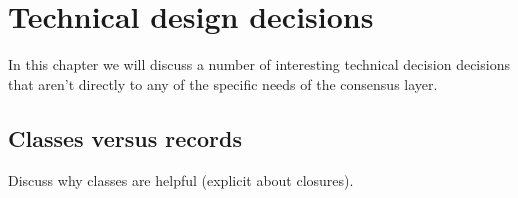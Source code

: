 \chapter{Technical design decisions}

In this chapter we will discuss a number of interesting technical decision
decisions that aren't directly to any of the specific needs of the consensus
layer.

\section{Classes versus records}
\label{classes-vs-records}

Discuss why classes are helpful (explicit about closures).
